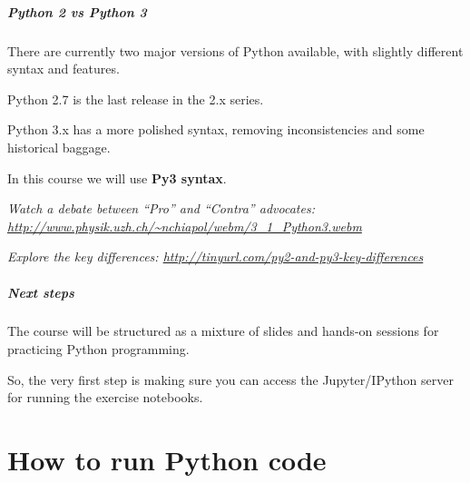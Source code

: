 \documentclass[english,serif,mathserif,xcolor=pdftex,dvipsnames,table]{beamer}
\begin{document}
\begin{frame}[fragile]
  \frametitle{Python 2 \emph{vs} Python 3}

  There are currently two major versions of Python available, with
  slightly different syntax and features.

  \+
  Python 2.7 is the last release in the 2.x series.

  \+
  Python 3.x has a more polished syntax, removing inconsistencies and
  some historical baggage.

  \+
  In this course we will use \textbf{Py3 syntax}.

  \+
  {\footnotesize\em
    Watch a debate between ``Pro'' and ``Contra'' advocates:
    \url{http://www.physik.uzh.ch/~nchiapol/webm/3_1_Python3.webm}}

  \+
  {\footnotesize\em
    Explore the key differences:
    \url{http://tinyurl.com/py2-and-py3-key-differences}}
\end{frame}




\begin{frame}
  \frametitle{Next steps}

  The course will be structured as a mixture of slides and hands-on
  sessions for practicing Python programming.

  \+
  So, the very first step is making sure you can access the Jupyter/IPython
  server for running the exercise notebooks.
\end{frame}


\part{How to run Python code}
\end{document}
